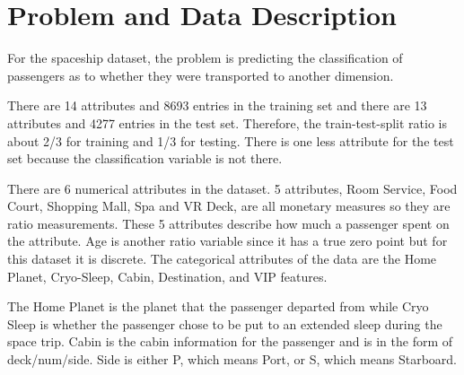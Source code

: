 \documentclass[fleqn,10pt]{SelfArx} %
\affiliation{\textsuperscript{1}\textit{Computer Science, School of Informatics , Computing and Engineering, Indiana University, Bloomington, IN, USA}} %
\begin{document}
\flushbottom %

\maketitle %

\tableofcontents %

\thispagestyle{empty} %






\section{Problem and Data Description} %

For the spaceship dataset, the problem is predicting the classification of passengers as to whether they were transported to another dimension. 

There are 14 attributes and 8693 entries in the training set and there are 13 attributes and 4277 entries in the test set. Therefore, the train-test-split ratio is about 2/3 for training and 1/3 for testing. There is one less attribute for the test set because the classification variable is not there. 

There are 6 numerical attributes in the dataset. 5 attributes, Room Service, Food Court, Shopping Mall, Spa and VR Deck, are all monetary measures so they are ratio measurements. These 5 attributes describe how much a passenger spent on the attribute. Age is another ratio variable since it has a true zero point but for this dataset it is discrete. The categorical attributes of the data are the Home Planet, Cryo-Sleep, Cabin, Destination, and VIP features. 

The Home Planet is the planet that the passenger departed from while Cryo Sleep is whether the passenger chose to be put to an extended sleep during the space trip. Cabin is the cabin information for the passenger and is in the form of deck/num/side. Side is either P, which means Port, or S, which means Starboard. 
\end{document}
